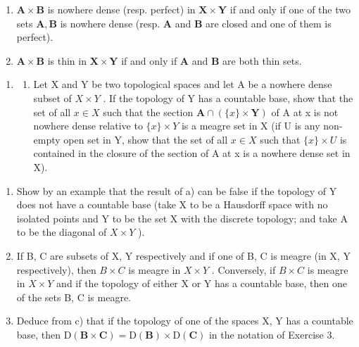 \begin{enumerate}
\def\labelenumi{\alph{enumi})}
\item
  \(\mathbf{A} \times \mathbf{B}\) is nowhere dense (resp. perfect) in \(\mathbf{X} \times \mathbf{Y}\) if and only if one of the two sets \(\mathbf{A}, \mathbf{B}\) is nowhere dense (resp. \(\mathbf{A}\) and \(\mathbf{B}\) are closed and one of them is perfect).
\item
  \(\mathbf{A} \times \mathbf{B}\) is thin in \(\mathbf{X} \times \mathbf{Y}\) if and only if \(\mathbf{A}\) and \(\mathbf{B}\) are both thin sets.
\end{enumerate}

\begin{enumerate}
\def\labelenumi{\arabic{enumi})}
\setcounter{enumi}{4}
\tightlist
\item
  \begin{enumerate}
  \def\labelenumii{\alph{enumii})}
  \tightlist
  \item
    Let X and Y be two topological spaces and let A be a nowhere dense subset of \(X \times Y\) . If the topology of Y has a countable base, show that the set of all \(x \in X\) such that the section \(\mathbf{A} \cap (\{x\} \times \mathbf{Y})\) of A at x is not nowhere dense relative to \(\{x\} \times Y\) is a meagre set in X (if U is any non-empty open set in Y, show that the set of all \(x \in X\) such that \(\{x\} \times U\) is contained in the closure of the section of A at x is a nowhere dense set in X).
  \end{enumerate}
\end{enumerate}

\begin{enumerate}
\def\labelenumi{\alph{enumi})}
\setcounter{enumi}{1}
\item
  Show by an example that the result of a) can be false if the topology of Y does not have a countable base (take X to be a Hausdorff space with no isolated points and Y to be the set X with the discrete topology; and take A to be the diagonal of \(X \times Y\) ).
\item
  If B, C are subsets of X, Y respectively and if one of B, C is meagre (in X, Y respectively), then \(B \times C\) is meagre in \(X \times Y\) . Conversely, if \(B \times C\) is meagre in \(X \times Y\) and if the topology of either X or Y has a countable base, then one of the sets B, C is meagre.
\item
  Deduce from c) that if the topology of one of the spaces X, Y has a countable base, then \(\mathrm{D}(\mathbf{B} \times \mathbf{C}) = \mathrm{D}(\mathbf{B}) \times \mathrm{D}(\mathbf{C})\) in the notation of Exercise 3.
\end{enumerate}

